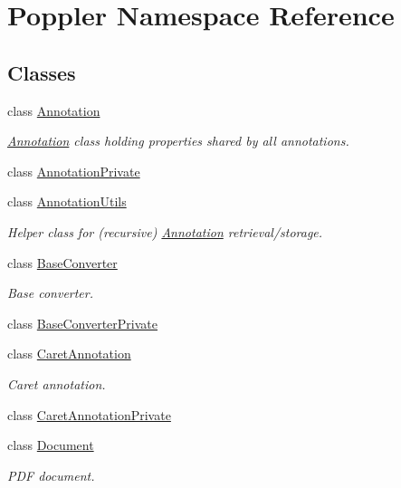 \hypertarget{namespace_poppler}{}\section{Poppler Namespace Reference}
\label{namespace_poppler}
\subsection*{Classes}
\begin{DoxyCompactItemize}
\item 
class \hyperlink{class_poppler_1_1_annotation}{Annotation}
\begin{DoxyCompactList}\small\item\em \hyperlink{class_poppler_1_1_annotation}{Annotation} class holding properties shared by all annotations. \end{DoxyCompactList}\item 
class \hyperlink{class_poppler_1_1_annotation_private}{Annotation\+Private}
\item 
class \hyperlink{class_poppler_1_1_annotation_utils}{Annotation\+Utils}
\begin{DoxyCompactList}\small\item\em Helper class for (recursive) \hyperlink{class_poppler_1_1_annotation}{Annotation} retrieval/storage. \end{DoxyCompactList}\item 
class \hyperlink{class_poppler_1_1_base_converter}{Base\+Converter}
\begin{DoxyCompactList}\small\item\em Base converter. \end{DoxyCompactList}\item 
class \hyperlink{class_poppler_1_1_base_converter_private}{Base\+Converter\+Private}
\item 
class \hyperlink{class_poppler_1_1_caret_annotation}{Caret\+Annotation}
\begin{DoxyCompactList}\small\item\em Caret annotation. \end{DoxyCompactList}\item 
class \hyperlink{class_poppler_1_1_caret_annotation_private}{Caret\+Annotation\+Private}
\item 
class \hyperlink{class_poppler_1_1_document}{Document}
\begin{DoxyCompactList}\small\item\em P\+DF document. \end{DoxyCompactList}\item 

\end{DoxyCompactItemize}

